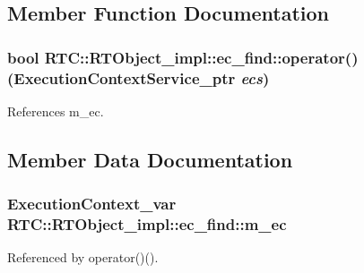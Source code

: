 \subsection{Member Function Documentation}
\subsubsection[{operator()}]{\setlength{\rightskip}{0pt plus 5cm}bool RTC::RTObject\_\-impl::ec\_\-find::operator() (ExecutionContextService\_\-ptr {\em ecs})\hspace{0.3cm}{\ttfamily  [inline]}}\label{structRTC_1_1RTObject__impl_1_1ec__find_a2b9470f95cc4e220ffbd5be9fa274fe1}


References m\_\-ec.



\subsection{Member Data Documentation}
\subsubsection[{m\_\-ec}]{\setlength{\rightskip}{0pt plus 5cm}ExecutionContext\_\-var {\bf RTC::RTObject\_\-impl::ec\_\-find::m\_\-ec}}\label{structRTC_1_1RTObject__impl_1_1ec__find_a4e03280b55014ecfb7c93ef85213027c}


Referenced by operator()().

